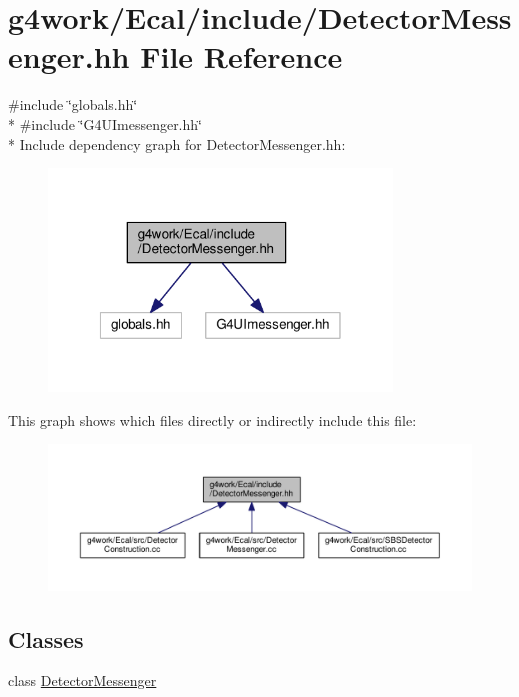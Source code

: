 \hypertarget{_detector_messenger_8hh}{\section{g4work/\-Ecal/include/\-Detector\-Messenger.hh File Reference}
\label{_detector_messenger_8hh}
}
{\ttfamily \#include \char`\"{}globals.\-hh\char`\"{}}\\*
{\ttfamily \#include \char`\"{}G4\-U\-Imessenger.\-hh\char`\"{}}\\*
Include dependency graph for Detector\-Messenger.\-hh\-:\nopagebreak
\begin{figure}[H]
\begin{center}
\leavevmode
\includegraphics[width=259pt]{_detector_messenger_8hh__incl}
\end{center}
\end{figure}
This graph shows which files directly or indirectly include this file\-:\nopagebreak
\begin{figure}[H]
\begin{center}
\leavevmode
\includegraphics[width=350pt]{_detector_messenger_8hh__dep__incl}
\end{center}
\end{figure}
\subsection*{Classes}
\begin{DoxyCompactItemize}
\item 
class \hyperlink{class_detector_messenger}{Detector\-Messenger}
\end{DoxyCompactItemize}
